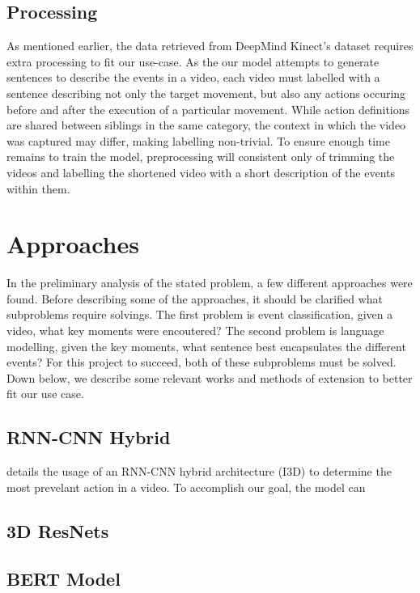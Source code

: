 \documentclass[10pt]{article}
\begin{document}
\subsection{Processing}
As mentioned earlier, the data retrieved from DeepMind Kinect's dataset requires extra processing to fit our use-case.
As the our model attempts to generate sentences to describe
the events in a video, each video must labelled with a sentence describing not only the target movement, but also
any actions occuring before and after the execution of a particular movement. While action definitions are shared between siblings
in the same category, the context in which the video was captured may differ, making labelling non-trivial.
To ensure enough time remains to train the model, preprocessing will consistent only of 
trimming the videos and labelling the shortened video with a short description of the events within them.

\section{Approaches}

In the preliminary analysis of the stated problem, a few different approaches were 
found. 
Before describing some of the approaches, it should be clarified what subproblems require solvings.
The first problem is event classification, given a video, what key moments were encoutered?
The second problem is language modelling, given the key moments, what sentence best encapsulates 
the different events? For this project to succeed, both of these subproblems must be solved.
Down below, we describe some relevant works and methods of extension to better fit our use case. 

\subsection{RNN-CNN Hybrid}
\cite{DBLP:journals/corr/abs-2010-10864} details the usage of an RNN-CNN hybrid architecture (I3D) to determine 
the most prevelant action in a video. To accomplish our goal, the model can  


\subsection{3D ResNets}



\subsection{BERT Model}
\end{document}
